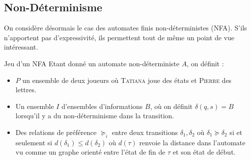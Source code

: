 \documentclass{cours}
\begin{document}
\subsection{Non-Déterminisme}
On considère désormais le cas des automates finis non-déterministes (NFA). S'ils n'apportent pas d'expressivité, ils permettent tout de même un point de vue intéressant.
\begin{définition}{Jeu d'un NFA}{}
    Etant donné un automate non-déterministe $A$, on définit :
    \begin{itemize}
        \item $P$ un ensemble de deux joueurs où \textsc{Tatiana} joue des états et \textsc{Pierre} des lettres.
        \item Un ensemble $I$ d'ensembles d'informations $B$, où on définit $\delta\left(q, s\right) = B$ lorsqu'il y a du non-déterminisme dans la transition.
        \item Des relations de préférence $\succeq_{i}$ entre deux transitions $\delta_{1}, \delta_{2}$ où $\delta_{1} \succeq \delta_{2}$ si et seulement si $d\left(\delta_{1}\right) \leq d(\delta_{2})$ où $d(\tau)$ renvoie la distance dans l'automate vu comme un graphe orienté entre l'état de fin de $\tau$ et son état de début.
    \end{itemize}
\end{définition}
\end{document}
